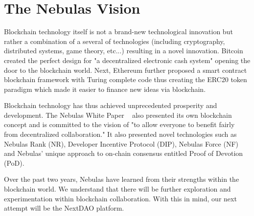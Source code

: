 \section {The Nebulas Vision}
Blockchain technology itself is not a brand-new technological innovation but rather a combination of a several of technologies (including cryptography, distributed systems, game theory, etc...) resulting in a novel innovation. Bitcoin ~\cite{Nakamoto2008} created the perfect design for "a decentralized electronic cash system" opening the door to the blockchain world. Next, Ethereum further proposed a smart contract blockchain framework with Turing complete code thus creating the ERC20 token paradigm which made it easier to finance new ideas via blockchain.

Blockchain technology has thus achieved unprecedented prosperity and development. The Nebulas White Paper ~\cite{TechWhitepaper} also presented its own blockchain concept and is committed to the vision of "to allow everyone to benefit fairly from decentralized collaboration." It also presented novel technologies such as Nebulas Rank (NR), Developer Incentive Protocol (DIP), Nebulas Force (NF) and Nebulas' unique approach to on-chain consensus entitled Proof of Devotion (PoD).

Over the past two years, Nebulas have learned from their strengths within the blockchain world. We understand that there will be further exploration and experimentation within blockchain collaboration. With this in mind, our next attempt will be the NextDAO platform.
